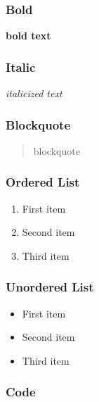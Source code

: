 \hypertarget{bold}{%
\subsubsection{Bold}\label{bold}}

\textbf{bold text}

\hypertarget{italic}{%
\subsubsection{Italic}\label{italic}}

\emph{italicized text}

\hypertarget{blockquote}{%
\subsubsection{Blockquote}\label{blockquote}}

\begin{quote}
blockquote
\end{quote}

\hypertarget{ordered-list}{%
\subsubsection{Ordered List}\label{ordered-list}}

\begin{enumerate}
\def\labelenumi{\arabic{enumi}.}
\tightlist
\item
  First item
\item
  Second item
\item
  Third item
\end{enumerate}

\hypertarget{unordered-list}{%
\subsubsection{Unordered List}\label{unordered-list}}

\begin{itemize}
\tightlist
\item
  First item
\item
  Second item
\item
  Third item
\end{itemize}

\hypertarget{code}{%
\subsubsection{Code}\label{code}}

